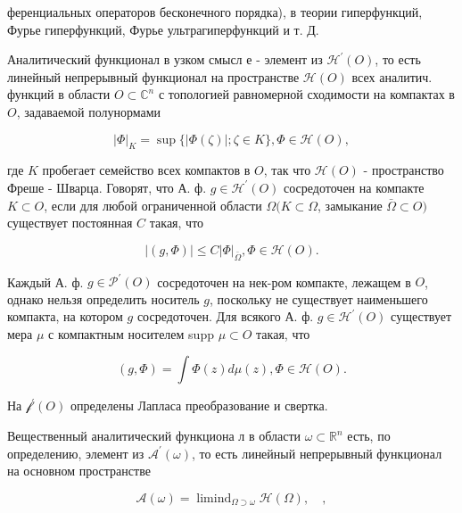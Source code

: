 \documentclass[10pt]{article}
\begin{document}
ференциальных операторов бесконечного порядка), в теории гиперфункций, Фурье гиперфункций, Фурье ультрагиперфункций и т. Д.



Аналитический функционал в узком смысл е - элемент из $\mathscr{H}^{\prime}(O)$, то есть линейный непрерывный функционал на пространстве $\mathscr{H}(O)$ всех аналитич. функций в области $O \subset \mathbb{C}^{n}$ с топологией равномерной сходимости на компактах в $O$, задаваемой полунормами



\[

|\Phi|_{K}=\sup \{|\Phi(\zeta)| ; \zeta \in K\}, \Phi \in \mathscr{H}(O),

\]



где $K$ пробегает семейство всех компактов в $O$, так что $\mathscr{H}(O)$ - пространство Фреше - Шварца. Говорят, что А. ф. $g \in \mathscr{H}^{\prime}(O)$ сосредоточен на компакте $K \subset O$, если для любой ограниченной области $\Omega(K \subset \Omega$, замыкание $\bar{\Omega} \subset O)$ существует постоянная $C$ такая, что



\[

|(g, \Phi)| \leqslant C|\Phi|_{\bar{\Omega}}, \Phi \in \mathscr{H}(O) .

\]



Каждый А. ф. $g \in \mathscr{P}^{\prime}(O)$ сосредоточен на нек-ром компакте, лежащем в $O$, однако нельзя определить носитель $g$, поскольку не существует наименьшего компакта, на котором $g$ сосредоточен. Для всякого А. ф. $g \in \mathscr{H}^{\prime}(O)$ существует мера $\mu$ с компактным носителем supp $\mu \subset O$ такая, что



\[

(g, \Phi)=\int \Phi(z) d \mu(z), \Phi \in \mathscr{H}(O) .

\]



На $\mathscr{f}^{\prime}(O)$ определены Лапласа преобразование и свертка.



Вещественный аналитический функциона л в области $\omega \subset \mathbb{R}^{n}$ есть, по определению, элемент из $\mathcal{A}^{\prime}(\omega)$, то есть линейный непрерывный функционал на основном пространстве



\[

\mathscr{A}(\omega)=\operatorname{limind}_{\Omega \supset \omega} \mathscr{H}(\Omega), \quad,

\]
\end{document}
